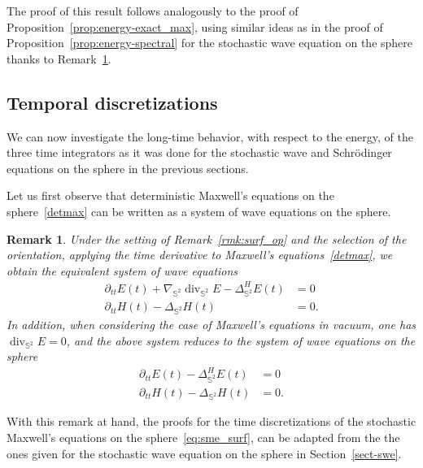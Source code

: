 \documentclass[11pt]{amsart}
\newtheorem{remark}[theorem]{Remark}
\newcommand{\IS}{\mathbb{S}}
\newcommand{\Deltalb}{\Delta_{\IS^2}}
\begin{document}
\begin{appendixproof}
	The proof of this result follows analogously to the proof of Proposition~\ref{prop:energy-exact_max}, using similar ideas as in the proof of Proposition~\ref{prop:energy-spectral} for the stochastic wave equation on the sphere thanks to Remark~\ref{rmk:dblw}.
\end{appendixproof}

\subsection{Temporal discretizations}

We can now investigate the long-time behavior, with respect to the energy, of the three time integrators as it was done
for the stochastic wave and Schr\"odinger equations on the sphere in the previous sections.

Let us first observe that deterministic Maxwell's equations on the sphere~\eqref{detmax} can be written as a system of wave equations
on the sphere.
\begin{remark}\label{rmk:dblw}
	Under the setting of Remark~\ref{rmk:surf_op} and the selection of the orientation, applying the time derivative to
	Maxwell's equations~\eqref{detmax}, we obtain the equivalent system of wave equations
	\begin{align*}
		\partial_{tt}E(t)+\nabla_{\IS^2}\operatorname{div}_{\IS^2} E-\Delta^{H}_{\IS^2} E(t)&=0\\
		\partial_{tt}H(t)-\Deltalb H(t)&=0.
	\end{align*}
	In addition, when considering the case of Maxwell's equations in vacuum, one has $\operatorname{div}_{\IS^2}E=0$, and the above
	system reduces to the system of wave equations on the sphere
	\begin{align*}
		\partial_{tt}E(t)-\Delta^{H}_{\IS^2} E(t)&=0\\
		\partial_{tt}H(t)-\Deltalb H(t)&=0.
	\end{align*}
\end{remark}
With this remark at hand, the proofs for the time discretizations of the stochastic Maxwell's equations on the sphere~\eqref{eq:sme_surf},
can be adapted from the the ones given for the stochastic wave equation on the sphere in Section~\ref{sect-swe}.
\end{document}
